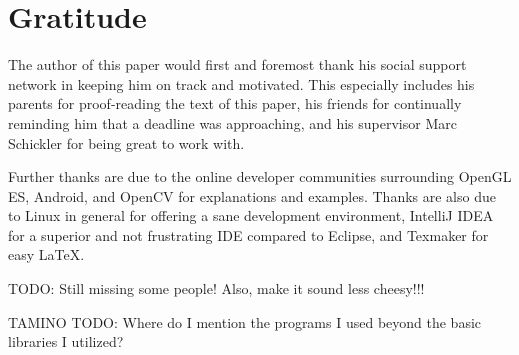 \section*{Gratitude}

The author of this paper would first and foremost thank his social support network in keeping him on track and motivated.
This especially includes his parents for proof-reading the text of this paper, his friends for continually reminding him that a deadline was approaching, and his supervisor Marc Schickler for being great to work with.

Further thanks are due to the online developer communities surrounding OpenGL ES, Android, and OpenCV for explanations and examples.
Thanks are also due to Linux in general for offering a sane development environment, IntelliJ IDEA for a superior and not frustrating IDE compared to Eclipse, and Texmaker for easy \LaTeX .

TODO: Still missing some people! Also, make it sound less cheesy!!!

TAMINO TODO: Where do I mention the programs I used beyond the basic libraries I utilized?
